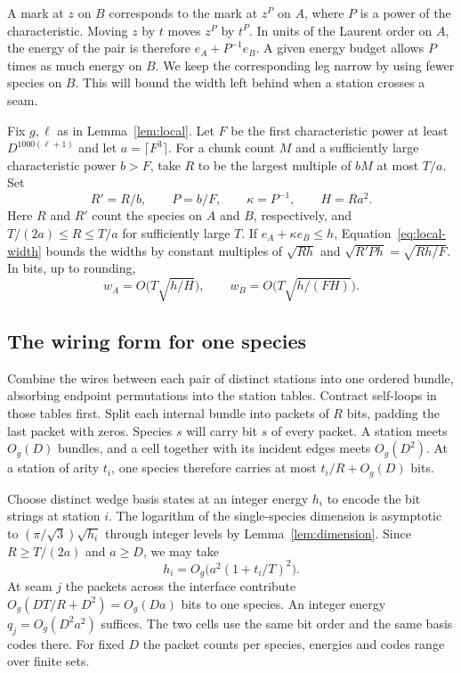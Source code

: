 A mark at $z$ on $B$ corresponds to the mark at $z^P$ on $A$, where $P$
is a power of the characteristic. Moving $z$ by $t$ moves $z^P$ by $t^P$.
In units of the Laurent order on $A$, the energy of the pair is therefore
$e_A+P^{-1}e_B$. A given energy budget allows $P$ times as much energy
on $B$. We keep the corresponding leg narrow by using fewer species on
$B$. This will bound the width left behind when a station crosses a seam.

Fix $g,\ell$ as in Lemma~\ref{lem:local}. Let $F$ be the first
characteristic power at least $D^{1000(\ell+1)}$ and let $a=\lceil F^3\rceil$.
For a chunk count $M$ and a sufficiently large characteristic power $b>F$,
take $R$ to be the largest multiple of $bM$ at most $T/a$. Set
\begin{equation}\label{eq:plant-scales}
 R'=R/b,\qquad P=b/F,\qquad \kappa=P^{-1},\qquad H=Ra^2 .
\end{equation}
Here $R$ and $R'$ count the species on $A$ and $B$, respectively, and
$T/(2a)\le R\le T/a$ for sufficiently large $T$. If $e_A+\kappa e_B\le h$,
Equation~\eqref{eq:local-width} bounds the widths by constant multiples
of $\sqrt{Rh}$ and $\sqrt{R'Ph}=\sqrt{Rh/F}$. In bits, up to rounding,
\begin{equation}\label{eq:plant-widths}
 w_A=O\bigl(T\sqrt{h/H}\bigr),\qquad
 w_B=O\bigl(T\sqrt{h/(FH)}\bigr).
\end{equation}

\subsection{The wiring form for one species}

Combine the wires between each pair of distinct stations into one ordered
bundle, absorbing endpoint permutations into the station tables. Contract
self-loops in those tables first. Split each internal bundle into packets
of $R$ bits, padding the last packet with zeros. Species $s$ will carry
bit $s$ of every packet. A station meets $O_g(D)$ bundles, and a cell
together with its incident edges meets $O_g(D^2)$. At a station of
arity $t_i$, one species therefore carries at most $t_i/R+O_g(D)$ bits.

Choose distinct wedge basis states at an integer energy $h_i$ to encode
the bit strings at station $i$. The logarithm of the single-species
dimension is asymptotic to $(\pi/\sqrt3)\sqrt{h_i}$ through integer
levels by Lemma~\ref{lem:dimension}. Since $R\ge T/(2a)$ and $a\ge D$,
we may take
\[
                 h_i=O_g\bigl(a^2(1+t_i/T)^2\bigr).
\]
At seam $j$ the packets across the interface contribute
$O_g(DT/R+D^2)=O_g(Da)$ bits to one species. An integer energy
$q_j=O_g(D^2a^2)$ suffices. The two cells use the same bit order and
the same basis codes there. For fixed $D$ the packet counts per
species, energies and codes range over finite sets.

